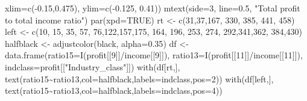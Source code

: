 \documentclass[
  10pt,
  b5paper]{book}
\newenvironment{Shaded}{\begin{snugshade}}{\end{snugshade}}
\newcommand{\AttributeTok}[1]{\textcolor[rgb]{0.77,0.63,0.00}{#1}}
\newcommand{\ConstantTok}[1]{\textcolor[rgb]{0.00,0.00,0.00}{#1}}
\newcommand{\DecValTok}[1]{\textcolor[rgb]{0.00,0.00,0.81}{#1}}
\newcommand{\FloatTok}[1]{\textcolor[rgb]{0.00,0.00,0.81}{#1}}
\newcommand{\FunctionTok}[1]{\textcolor[rgb]{0.00,0.00,0.00}{#1}}
\newcommand{\NormalTok}[1]{#1}
\newcommand{\OtherTok}[1]{\textcolor[rgb]{0.56,0.35,0.01}{#1}}
\newcommand{\SpecialCharTok}[1]{\textcolor[rgb]{0.00,0.00,0.00}{#1}}
\newcommand{\StringTok}[1]{\textcolor[rgb]{0.31,0.60,0.02}{#1}}
\begin{document}
\begin{Shaded}
\begin{Highlighting}[]
     \AttributeTok{xlim=}\FunctionTok{c}\NormalTok{(}\SpecialCharTok{{-}}\FloatTok{0.15}\NormalTok{,}\FloatTok{0.475}\NormalTok{), }\AttributeTok{ylim=}\FunctionTok{c}\NormalTok{(}\SpecialCharTok{{-}}\FloatTok{0.125}\NormalTok{, }\FloatTok{0.41}\NormalTok{))}
\FunctionTok{mtext}\NormalTok{(}\AttributeTok{side=}\DecValTok{3}\NormalTok{, }\AttributeTok{line=}\FloatTok{0.5}\NormalTok{, }\StringTok{"Total profit to total income ratio"}\NormalTok{)}
\FunctionTok{par}\NormalTok{(}\AttributeTok{xpd=}\ConstantTok{TRUE}\NormalTok{)}
\NormalTok{rt }\OtherTok{\textless{}{-}} \FunctionTok{c}\NormalTok{(}\DecValTok{31}\NormalTok{,}\DecValTok{37}\NormalTok{,}\DecValTok{167}\NormalTok{, }\DecValTok{330}\NormalTok{, }\DecValTok{385}\NormalTok{, }\DecValTok{441}\NormalTok{, }\DecValTok{458}\NormalTok{)}
\NormalTok{left }\OtherTok{\textless{}{-}} \FunctionTok{c}\NormalTok{(}\DecValTok{10}\NormalTok{, }\DecValTok{15}\NormalTok{, }\DecValTok{35}\NormalTok{, }\DecValTok{57}\NormalTok{, }\DecValTok{76}\NormalTok{,}\DecValTok{122}\NormalTok{,}\DecValTok{157}\NormalTok{,}\DecValTok{175}\NormalTok{, }\DecValTok{164}\NormalTok{, }\DecValTok{196}\NormalTok{, }\DecValTok{253}\NormalTok{, }\DecValTok{274}\NormalTok{, }\DecValTok{292}\NormalTok{,}\DecValTok{341}\NormalTok{,}\DecValTok{362}\NormalTok{, }\DecValTok{384}\NormalTok{,}\DecValTok{430}\NormalTok{)}
\NormalTok{halfblack }\OtherTok{\textless{}{-}} \FunctionTok{adjustcolor}\NormalTok{(}\StringTok{\textquotesingle{}black\textquotesingle{}}\NormalTok{, }\AttributeTok{alpha=}\FloatTok{0.35}\NormalTok{)}
\NormalTok{df }\OtherTok{\textless{}{-}} \FunctionTok{data.frame}\NormalTok{(}\AttributeTok{ratio15=}\FunctionTok{I}\NormalTok{(profit[[}\DecValTok{9}\NormalTok{]]}\SpecialCharTok{/}\NormalTok{income[[}\DecValTok{9}\NormalTok{]]), }\AttributeTok{ratio13=}\FunctionTok{I}\NormalTok{(profit[[}\DecValTok{11}\NormalTok{]]}\SpecialCharTok{/}\NormalTok{income[[}\DecValTok{11}\NormalTok{]]),}
                 \AttributeTok{indclass=}\NormalTok{profit[[}\StringTok{"Industry\_class"}\NormalTok{]])}
\FunctionTok{with}\NormalTok{(df[rt,], }\FunctionTok{text}\NormalTok{(ratio15}\SpecialCharTok{\textasciitilde{}}\NormalTok{ratio13,}\AttributeTok{col=}\NormalTok{halfblack,}\AttributeTok{labels=}\NormalTok{indclass,}\AttributeTok{pos=}\DecValTok{2}\NormalTok{))}
\FunctionTok{with}\NormalTok{(df[left,], }\FunctionTok{text}\NormalTok{(ratio15}\SpecialCharTok{\textasciitilde{}}\NormalTok{ratio13,}\AttributeTok{col=}\NormalTok{halfblack,}\AttributeTok{labels=}\NormalTok{indclass,}\AttributeTok{pos=}\DecValTok{4}\NormalTok{))}
\end{Highlighting}
\end{Shaded}
\end{document}
